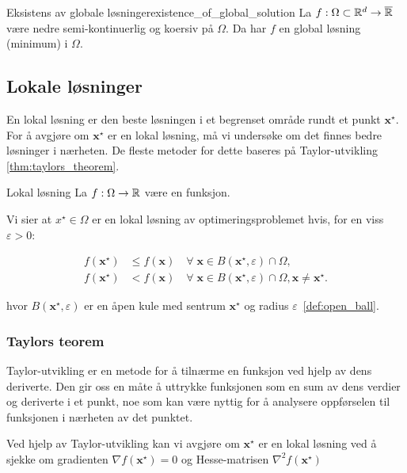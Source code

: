 \begin{theorem}{Eksistens av globale løsninger}{existence_of_global_solution}
	La \(f: \Omega \subset \mathbb{R}^d \to \overline{\mathbb{R}}\) være nedre semi-kontinuerlig og koersiv på \(\Omega\). Da har \(f\) en global løsning (minimum) i \(\Omega\).
\end{theorem}

\subsection{Lokale løsninger}
En lokal løsning er den beste løsningen i et begrenset område rundt et punkt \(\symbf{x}^\star\).
For å avgjøre om \(\symbf{x}^\star\) er en lokal løsning, må vi undersøke om det finnes bedre løsninger i nærheten.
De fleste metoder for dette baseres på Taylor-utvikling \ref{thm:taylors_theorem}.


\begin{definition}{Lokal løsning}{}
	La \(f: \Omega \to \mathbb{R}\) være en funksjon.

	Vi sier at \(x^\star \in \Omega\) er en lokal løsning av optimeringsproblemet hvis, for en viss \(\varepsilon > 0\):

	\begin{align*}
		f(\symbf{x}^\star) & \leq f(\symbf{x}) \quad \forall \; \symbf{x} \in B(\symbf{x}^\star, \varepsilon) \cap \Omega,                                                  \\
		f(\symbf{x}^\star) & < f(\symbf{x}) \quad \forall \; \symbf{x} \in B(\symbf{x}^\star, \varepsilon) \cap \Omega, \symbf{x} \neq \symbf{x}^\star. \tag{Strengt lokal}
	\end{align*}

	hvor \(B(\symbf{x}^\star, \varepsilon)\) er en åpen kule med sentrum \(\symbf{x}^\star\) og radius \(\varepsilon\)~\ref{def:open_ball}.
\end{definition}

\subsubsection{Taylors teorem}
Taylor-utvikling er en metode for å tilnærme en funksjon ved hjelp av dens deriverte.
Den gir oss en måte å uttrykke funksjonen som en sum av dens verdier og deriverte i et punkt, noe som kan være nyttig for å analysere oppførselen til funksjonen i nærheten av det punktet.

Ved hjelp av Taylor-utvikling kan vi avgjøre om \(\symbf{x}^\star\) er en lokal løsning ved å sjekke om gradienten \(\nabla f(\symbf{x}^\star) = 0\) og Hesse-matrisen \(\nabla^2 f(\symbf{x}^\star)\)

